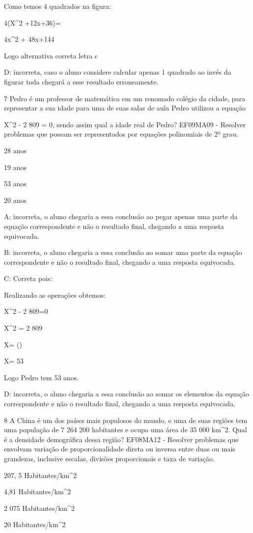 Como temos 4 quadrados na figura:

4\times (X^2 +12x+36)=

4x^2 + 48x+144

Logo alternativa correta letra c

D: incorreta, caso o aluno considere calcular apenas 1 quadrado ao invés
da figurar toda chegará a esse resultado erroneamente.

\num{7} Pedro é um professor de matemática em um renomado colégio da cidade,
para representar a sua idade para uma de suas salas de aula Pedro
utilizou a equação

X^2 - 2 809 = 0, sendo assim qual a idade real de Pedro? EF09MA09 -
Resolver problemas que possam ser representados por equações polinomiais
de 2º grau.

\item 28 anos
\item 19 anos
\item 53 anos
\item 20 anos

A: incorreta, o aluno chegaria a essa conclusão ao pegar apenas uma
parte da equação correspondente e não o resultado final, chegando a uma
resposta equivocada.

B: incorreta, o aluno chegaria a essa conclusão ao somar uma parte da
equação correspondente e não o resultado final, chegando a uma resposta
equivocada.

C: Correta pois:

Realizando as operações obtemos:

X^2 - 2 809=0

X^2 = 2 809

X= ()

X= 53

Logo Pedro tem 53 anos.

D: incorreta, o aluno chegaria a essa conclusão ao somar os elementos da
equação correspondente e não o resultado final, chegando a uma resposta
equivocada.

\num{8} A China é um dos países mais populosos do mundo, e uma de suas
regiões tem uma população de 7 264 200 habitantes e ocupa uma área de 35
000 km^2. Qual é a densidade demográfica dessa região? EF08MA12 -
Resolver problemas que envolvam variação de proporcionalidade direta ou
inversa entre duas ou mais grandezas, inclusive escalas, divisões
proporcionais e taxa de variação.

\item 207, 5 Habitantes/km^2
\item 4,81 Habitantes/km^2
\item 2 075 Habitantes/km^2
\item 20 Habitantes/km^2

